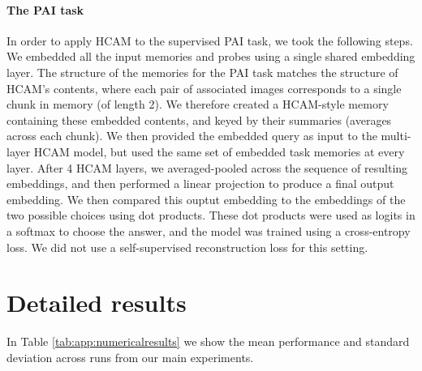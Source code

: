 \paragraph{The PAI task}
In order to apply HCAM to the supervised PAI task, we took the following steps. We embedded all the input memories and probes using a single shared embedding layer. The structure of the memories for the PAI task matches the structure of HCAM's contents, where each pair of associated images corresponds to a single chunk in memory (of length 2). We therefore created a HCAM-style memory containing these embedded contents, and keyed by their summaries (averages across each chunk). We then provided the embedded query as input to the multi-layer HCAM model, but used the same set of embedded task memories at every layer. After 4 HCAM layers, we averaged-pooled across the sequence of resulting embeddings, and then performed a linear projection to produce a final output embedding. We then compared this ouptut embedding to the embeddings of the two possible choices using dot products. These dot products were used as logits in a softmax to choose the answer, and the model was trained using a cross-entropy loss. We did not use a self-supervised reconstruction loss for this setting.

\section{Detailed results}

In Table \ref{tab:app:numericalresults} we show the mean performance and standard deviation across runs from our main experiments.

